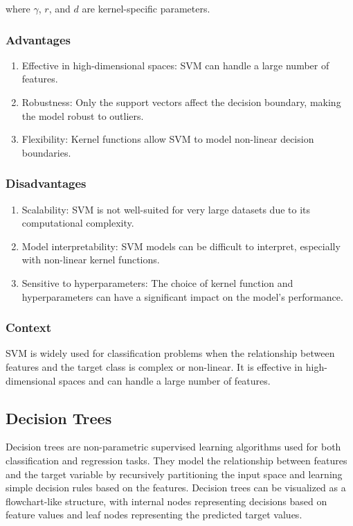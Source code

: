 \documentclass[12pt]{article}
\begin{document}
where $\gamma$, $r$, and $d$ are kernel-specific parameters.

\subsubsection{Advantages}
\begin{enumerate}
\item Effective in high-dimensional spaces: SVM can handle a large number of features.
\item Robustness: Only the support vectors affect the decision boundary, making the model robust to outliers.
\item Flexibility: Kernel functions allow SVM to model non-linear decision boundaries.
\end{enumerate}

\subsubsection{Disadvantages}
\begin{enumerate}
\item Scalability: SVM is not well-suited for very large datasets due to its computational complexity.
\item Model interpretability: SVM models can be difficult to interpret, especially with non-linear kernel functions.
\item Sensitive to hyperparameters: The choice of kernel function and hyperparameters can have a significant impact on the model's performance.
\end{enumerate}

\subsubsection{Context}

SVM is widely used for classification problems when the relationship between features and the target class is complex or non-linear. It is effective in high-dimensional spaces and can handle a large number of features.


\subsection{Decision Trees}

Decision trees are non-parametric supervised learning algorithms used for both classification and regression tasks. They model the relationship between features and the target variable by recursively partitioning the input space and learning simple decision rules based on the features. Decision trees can be visualized as a flowchart-like structure, with internal nodes representing decisions based on feature values and leaf nodes representing the predicted target values.
\end{document}
